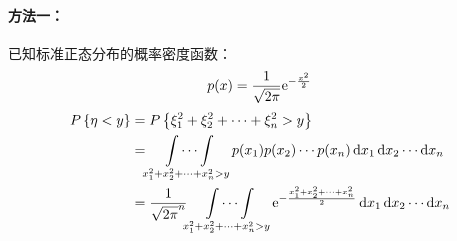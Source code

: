 \paragraph{方法一：}
已知标准正态分布的概率密度函数：\[
    p(x) = \frac{1}{\sqrt{2\pi}} \mathrm{e}^{-\frac{x^{2}}{2}}
\]
\begin{align*}
    \P{\eta<y} &= \P{\xi_{1}^{2} + \xi_{2}^{2} + \cdots +
    \xi_{n}^{2} > y} \\
    &= \idotsint\limits_{x_{1}^{2} + x_{2}^{2} + \cdots +
    x_{n}^{2} > y} p(x_{1}) p(x_{2}) \cdots p(x_{n}) \d{x}_{1}
    \d{x}_{2} \cdots \d{x}_{n} \\
    &= \frac{1}{\sqrt{2\pi}^{n}}
    \idotsint\limits_{x_{1}^{2} + x_{2}^{2} + \cdots + x_{n}^{2} > y}
    \e^{-\frac{x_{1}^{2}+ x_{2}^{2} +\dots + x_{n}^{2}}{2}}
    \d{x}_{1} \d{x}_{2} \cdots \d{x}_{n} \\
\end{align*}

